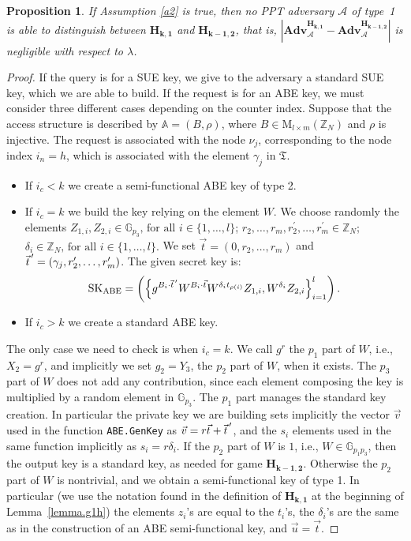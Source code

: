 \documentclass[a4paper,10pt]{article}
\newtheorem{proposition}{Proposition}
\newcommand{\G}{\mathbb{G}}
\newcommand{\Z}{\mathbb{Z}}
\newcommand{\adv}{\textbf{Adv}}
\newcommand{\tree}{\mathfrak{T}}
\newcommand{\varRow}{l}
\newcommand{\varColumn}{m}
\newcommand{\pvec}[2][]{{\hspace{-0.05em}\vec{\hspace{0.05em}#2}\mkern2mu\vphantom{#2}}^\prime_{\hspace{-0.18em}#1}}
\newcommand{\matrixset}[3]{\text{M}_{#1\times #2}(#3)}
\newcommand{\algorithm}[2]{\texttt{#1.#2}}
\newcommand{\randomchoose}[1]{We choose randomly the element\ifstrequal{#1}{s}{}{s} }
\newcommand{\game}[2]{$\mathbf{#1_{#2}}$}
\newcommand{\mathgame}[2]{\mathbf{#1_{#2}}}
\newcommand{\typeone}{type~1}
\begin{document}
	\begin{proposition}
		\label{prop.h1}
		If Assumption \ref{a2} is true, then no PPT adversary $\mathcal{A}$ of \typeone{} is able to distinguish between \game{H}{k,1} and \game{H}{k-1,2}, that is, $\left| \adv_{\mathcal{A}}^{\mathgame{H}{k,1}} - \adv_{\mathcal{A}}^{\mathgame{H}{k-1,2}}\right|$ is negligible with respect to $\lambda$.
	\end{proposition}
	\begin{proof}
If the query is for a SUE key, we give to the adversary a standard SUE key, which we are able to build. If the request is for an ABE key, we must consider three different cases depending on the counter index. Suppose that the access structure is described by $\mathbb{A}=(B,\rho)$, where $B\in\matrixset{\varRow}{\varColumn}{\Z_N}$ and $\rho$ is injective. The request is associated with the node $\nu_j$, corresponding to the node index $i_n=h$, which is associated with the element $\gamma_j$ in $\tree$.
		\begin{itemize}
			\item
			If $i_c<k$ we create a semi-functional ABE key of type 2.
			\item
			If $i_c=k$ we build the key relying on the element $W$.
			\randomchoose{p}{$Z_{1,i},Z_{2,i}\in\G_{p_3}\text{, for all }i\in \{1,\ldots,\varRow\}$;
				$r_{2},\ldots,r_{\varColumn},r^\prime_{2},\ldots,r^\prime_{\varColumn}\in \Z_N$;
				$\delta_i\in\Z_N\text{, for all }i\in \{1,\ldots,\varRow\}$.
			}
			We set $\vec{t}=(0,r_{2},\ldots,r_{\varColumn})$ and $\pvec{t}=(\gamma_j,r^\prime_{2},\ldots,r^\prime_{\varColumn})$.			
			The given secret key is:			
			\[
				\mathrm{SK}_\textnormal{ABE}=\left( \left\{ g^{B_i\cdot \pvec{t}} W^{B_i\cdot\vec{t}}W^{\delta_i t_{\rho(i)}} Z_{1,i}, W^{\delta_i}Z_{2,i} \right\}_{i=1}^{\varRow} \right).
			\]
			\item
			If $i_c>k$ we create a standard ABE key.
		\end{itemize}
		The only case we need to check is when $i_c=k$.
		We call $g^r$ the $p_1$ part of $W$, i.e., $X_2=g^r$, and implicitly we set $g_2=Y_3$, the $p_2$ part of $W$, when it exists.
		The $p_3$ part of $W$ does not add any contribution, since each element composing the key is multiplied by a random element in $\G_{p_3}$.
		The $p_1$ part manages the standard key creation. In particular the private key we are building sets implicitly the vector $\vec{v}$ used in the function \algorithm{ABE}{GenKey} as $\vec{v}=r\vec{t}+\pvec{t}$, and the $s_i$ elements used in the same function implicitly as $s_i=r\delta_i$.
		If the $p_2$ part of $W$ is $1$, i.e., $W\in\G_{p_1p_3}$, then the output key is a standard key, as needed for game \game{H}{k-1,2}.
		Otherwise the $p_2$ part of $W$ is nontrivial, and we obtain a semi-functional key of type 1. In particular (we use the notation found in the definition of \game{H}{k,1} at the beginning of Lemma~\ref{lemma.g1h}) the elements $z_i$'s are equal to the $t_i$'s, the $\delta_i$'s are the same as in the construction of an ABE semi-functional key, and $\vec{u}=\vec{t}$.
		

\end{proof}
\end{document}
